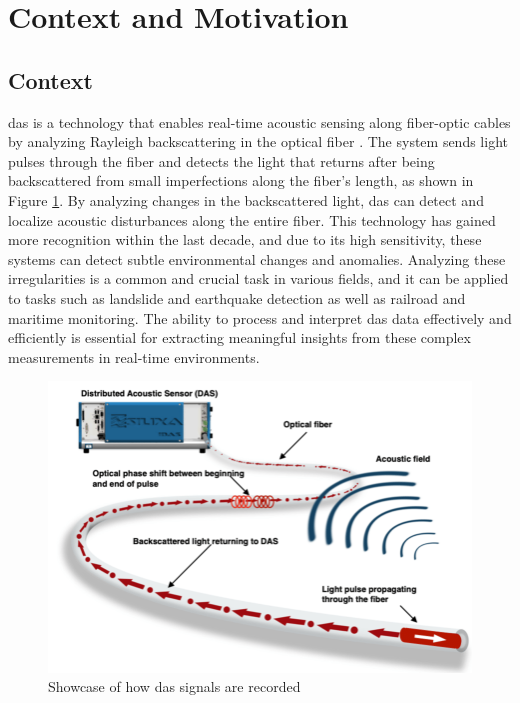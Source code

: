 \section{Context and Motivation}

\subsection{Context} 

\acrfull{das} is a technology that enables real-time acoustic sensing along fiber-optic cables by analyzing Rayleigh backscattering in the optical fiber \cite{shang2016optical}. The system sends light pulses through the fiber and detects the light that returns after being backscattered from small imperfections along the fiber's length, as shown in Figure \ref{fig:das-fig}. By analyzing changes in the backscattered light, \acrshort{das} can detect and localize acoustic disturbances along the entire fiber. This technology has gained more recognition within the last decade, and due to its high sensitivity, these systems can detect subtle environmental changes and anomalies. Analyzing these irregularities is a common and crucial task in various fields, and it can be applied to tasks such as landslide and earthquake detection as well as railroad and maritime monitoring. The ability to process and interpret \acrshort{das} data effectively and efficiently is essential for extracting meaningful insights from these complex measurements in real-time environments. \\

\begin{figure}[htbp]
    \centering
    \includegraphics[width=0.7\linewidth]{figures/das.png}
    \caption{Showcase of how \acrshort{das} signals are recorded\footnotemark}
    \label{fig:das-fig}
\end{figure}


